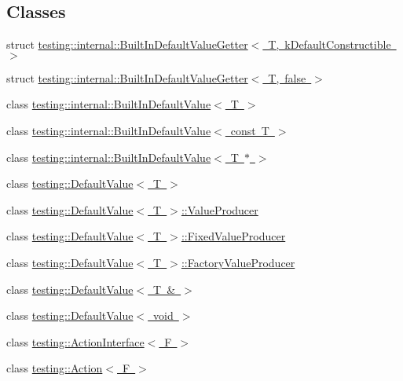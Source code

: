 \subsection*{Classes}
\begin{DoxyCompactItemize}
\item 
struct \mbox{\hyperlink{structtesting_1_1internal_1_1_built_in_default_value_getter}{testing\+::internal\+::\+Built\+In\+Default\+Value\+Getter$<$ T, k\+Default\+Constructible $>$}}
\item 
struct \mbox{\hyperlink{structtesting_1_1internal_1_1_built_in_default_value_getter_3_01_t_00_01false_01_4}{testing\+::internal\+::\+Built\+In\+Default\+Value\+Getter$<$ T, false $>$}}
\item 
class \mbox{\hyperlink{classtesting_1_1internal_1_1_built_in_default_value}{testing\+::internal\+::\+Built\+In\+Default\+Value$<$ T $>$}}
\item 
class \mbox{\hyperlink{classtesting_1_1internal_1_1_built_in_default_value_3_01const_01_t_01_4}{testing\+::internal\+::\+Built\+In\+Default\+Value$<$ const T $>$}}
\item 
class \mbox{\hyperlink{classtesting_1_1internal_1_1_built_in_default_value_3_01_t_01_5_01_4}{testing\+::internal\+::\+Built\+In\+Default\+Value$<$ T $\ast$ $>$}}
\item 
class \mbox{\hyperlink{classtesting_1_1_default_value}{testing\+::\+Default\+Value$<$ T $>$}}
\item 
class \mbox{\hyperlink{classtesting_1_1_default_value_1_1_value_producer}{testing\+::\+Default\+Value$<$ T $>$\+::\+Value\+Producer}}
\item 
class \mbox{\hyperlink{classtesting_1_1_default_value_1_1_fixed_value_producer}{testing\+::\+Default\+Value$<$ T $>$\+::\+Fixed\+Value\+Producer}}
\item 
class \mbox{\hyperlink{classtesting_1_1_default_value_1_1_factory_value_producer}{testing\+::\+Default\+Value$<$ T $>$\+::\+Factory\+Value\+Producer}}
\item 
class \mbox{\hyperlink{classtesting_1_1_default_value_3_01_t_01_6_01_4}{testing\+::\+Default\+Value$<$ T \& $>$}}
\item 
class \mbox{\hyperlink{classtesting_1_1_default_value_3_01void_01_4}{testing\+::\+Default\+Value$<$ void $>$}}
\item 
class \mbox{\hyperlink{classtesting_1_1_action_interface}{testing\+::\+Action\+Interface$<$ F $>$}}
\item 
class \mbox{\hyperlink{classtesting_1_1_action}{testing\+::\+Action$<$ F $>$}}

\end{DoxyCompactItemize}
